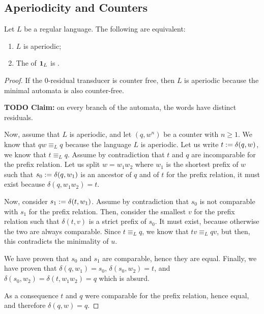 \subsection{Aperiodicity and Counters}


\begin{lemma}
    \label{aperiodic-iff-residual:lem}
    Let $L$ be a regular language.
    The following are equivalent:
    \begin{enumerate}
        \item $L$ is aperiodic;
        \item The  of $\mathbf{1}_{L}$
            is .
    \end{enumerate}
\end{lemma}
\begin{proof}
    If the $0$-residual transducer is counter free,
    then $L$ is aperiodic because the minimal automata is also counter-free.

    \textbf{TODO Claim:}
    on every branch of the automata, the words have distinct residuals.

    Now, assume that $L$ is aperiodic, and let $(q,w^n)$ be a counter with $n
    \geq 1$. We know that $qw \equiv_L q$ because the language $L$ is
    aperiodic. Let us write $t \mathrel{:=} \delta(q,w)$, we know that $t \equiv_L
    q$. Assume by contradiction that $t$ and $q$ are incomparable for the
    prefix relation. Let us split $w = w_1 w_2$ where $w_1$ is the shortest
    prefix of $w$ such that $s_0 \mathrel{:=} \delta(q,w_1)$ is an ancestor of $q$
    and of $t$ for the prefix relation, it must exist because $\delta(q,w_1
    w_2) = t$.

    Now, consider $s_1 \mathrel{:=} \delta(t, w_1)$. Assume by contradiction that
    $s_0$ is not comparable with $s_1$ for the prefix relation. Then, consider
    the smallest $v$ for the prefix relation such that $\delta(t, v)$ is a
    strict prefix of $s_0$. It must exist, because otherwise the two are always
    comparable. Since $t \equiv_L q$, we know that $tv \equiv_L qv$, but then,
    this contradicts the minimality of $u$.

    We have proven that $s_0$ and $s_1$ are comparable, hence they
    are equal.
    Finally, we have proven that $\delta(q, w_1) = s_0$,
    $\delta(s_0, w_2) = t$, and $\delta(s_0, w_2) = \delta(t, w_1w_2) = q$ which is absurd.

    As a consequence $t$ and $q$ were comparable for the prefix relation,
    hence equal, and therefore $\delta(q, w) = q$.
\end{proof}

